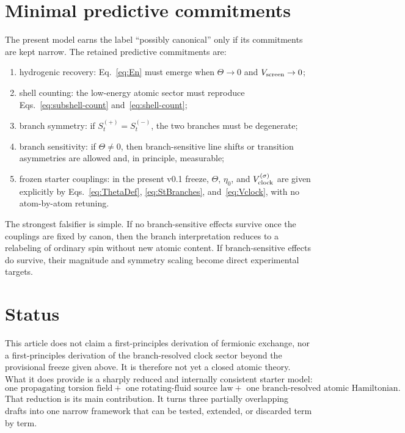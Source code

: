\documentclass[11pt,a4paper]{article}
\begin{document}
\section{Minimal predictive commitments}
The present model earns the label ``possibly canonical'' only if its commitments are kept narrow. The retained predictive commitments are:
\begin{enumerate}[label=(P\arabic*)]
    \item hydrogenic recovery: Eq.~\eqref{eq:En} must emerge when $\Theta\to 0$ and $V_{\rm screen}\to 0$;
    \item shell counting: the low-energy atomic sector must reproduce Eqs.~\eqref{eq:subshell-count} and~\eqref{eq:shell-count};
    \item branch symmetry: if $S_t^{(+)}=S_t^{(-)}$, the two branches must be degenerate;
    \item branch sensitivity: if $\Theta\neq 0$, then branch-sensitive line shifts or transition asymmetries are allowed and, in principle, measurable;
    \item frozen starter couplings: in the present v0.1 freeze, $\Theta$, $\eta_0$, and $V_{\rm clock}^{(\sigma)}$ are given explicitly by Eqs.~\eqref{eq:ThetaDef}, \eqref{eq:StBranches}, and~\eqref{eq:Vclock}, with no atom-by-atom retuning.
\end{enumerate}

The strongest falsifier is simple. If no branch-sensitive effects survive once the couplings are fixed by canon, then the branch interpretation reduces to a relabeling of ordinary spin without new atomic content. If branch-sensitive effects do survive, their magnitude and symmetry scaling become direct experimental targets.

\section{Status}
This article does not claim a first-principles derivation of fermionic exchange, nor a first-principles derivation of the branch-resolved clock sector beyond the provisional freeze given above. It is therefore not yet a closed atomic theory. What it does provide is a sharply reduced and internally consistent starter model:
\begin{equation}
\boxed{
\text{one propagating torsion field}
+\text{ one rotating-fluid source law}
+\text{ one branch-resolved atomic Hamiltonian}.
}
\end{equation}
That reduction is its main contribution. It turns three partially overlapping drafts into one narrow framework that can be tested, extended, or discarded term by term.
\end{document}
